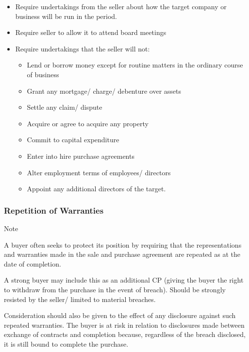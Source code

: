 \documentclass[
]{article}
\providecommand{\tightlist}{%
  \setlength{\itemsep}{0pt}\setlength{\parskip}{0pt}}
\newenvironment{env-48e9bfc8-c3dd-4504-a5fa-3b34b9a27ccf}
{
    \savenotes\tcolorbox[blanker,breakable,left=5pt,borderline west={2pt}{-4pt}{blue}]
}
{
    \endtcolorbox\spewnotes
}
\begin{document}
\begin{itemize}
\tightlist
\item
  Require undertakings from the seller about how the target company or
  business will be run in the period.
\item
  Require seller to allow it to attend board meetings
\item
  Require undertakings that the seller will not:

  \begin{itemize}
  \tightlist
  \item
    Lend or borrow money except for routine matters in the ordinary
    course of business
  \item
    Grant any mortgage/ charge/ debenture over assets
  \item
    Settle any claim/ dispute
  \item
    Acquire or agree to acquire any property
  \item
    Commit to capital expenditure
  \item
    Enter into hire purchase agreements
  \item
    Alter employment terms of employees/ directors
  \item
    Appoint any additional directors of the target.
  \end{itemize}
\end{itemize}

\hypertarget{repetition-of-warranties}{%
\subsubsection{Repetition of
Warranties}\label{repetition-of-warranties}}

\begin{env-48e9bfc8-c3dd-4504-a5fa-3b34b9a27ccf}

Note

A buyer often seeks to protect its position by requiring that the
representations and warranties made in the sale and purchase agreement
are repeated as at the date of completion.

\end{env-48e9bfc8-c3dd-4504-a5fa-3b34b9a27ccf}

A strong buyer may include this as an additional CP (giving the buyer
the right to withdraw from the purchase in the event of breach). Should
be strongly resisted by the seller/ limited to material breaches.

Consideration should also be given to the effect of any disclosure
against such repeated warranties. The buyer is at risk in relation to
disclosures made between exchange of contracts and completion because,
regardless of the breach disclosed, it is still bound to complete the
purchase.
\end{document}

